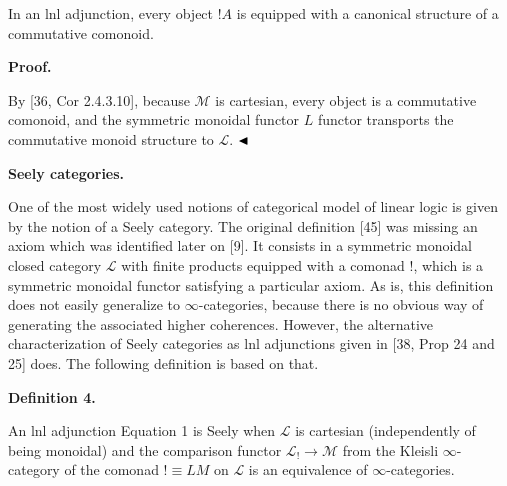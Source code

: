 \documentclass[10pt,a4paper]{article}
\begin{document}
In an lnl adjunction, every object $\mathop{!}A$ is equipped with a canonical structure of a commutative comonoid.\par
 
 
 
 
\par\medskip\noindent\textbf{Proof.}\par
 
 
By [36, Cor 2.4.3.10], because ${\mathcal{M}}$ is cartesian, every object is a commutative comonoid, and the symmetric monoidal functor $L$ functor transports the commutative monoid structure to ${\mathcal{L}}$. $\hfill\blacktriangleleft$\par
 
 
 
 
\par\medskip\noindent\textbf{Seely categories.}\par
 
 
One of the most widely used notions of categorical model of linear logic is given by the notion of a Seely category. The original definition [45] was missing an axiom which was identified later on [9]. It consists in a symmetric monoidal closed category ${\mathcal{L}}$ with finite products equipped with a comonad $\mathop{!}$, which is a symmetric monoidal functor satisfying a particular axiom. As is, this definition does not easily generalize to $\infty$-categories, because there is no obvious way of generating the associated higher coherences. However, the alternative characterization of Seely categories as lnl adjunctions given in [38, Prop 24 and 25] does. The following definition is based on that.\par
 
 
 
\par\medskip\noindent\textbf{Definition 4.}\par
 
 
An lnl adjunction Equation 1 is Seely when ${\mathcal{L}}$ is cartesian (independently of being monoidal) and the comparison functor ${\mathcal{L}}_{\mathop{!}}\to{\mathcal{M}}$ from the Kleisli $\infty$-category of the comonad $\mathop{!}\equiv LM$ on ${\mathcal{L}}$ is an equivalence of $\infty$-categories.\par
 
\end{document}
